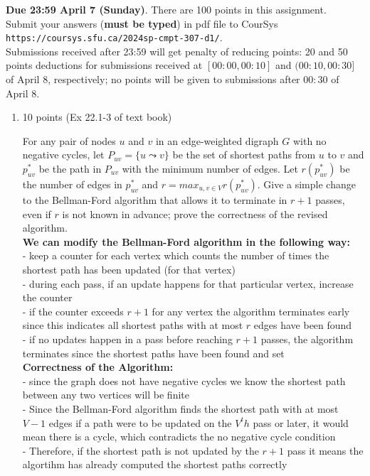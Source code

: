 \documentclass[letterpaper,12pt]{article}
\begin{document}

\pagestyle{myheadings}

\noindent
{\bf Due 23:59 April 7 (Sunday)}. There are 100 points in this assignment. \\
Submit your answers ({\bf must be typed}) in pdf file to CourSys\\
{\tt https://coursys.sfu.ca/2024sp-cmpt-307-d1/}.\\
Submissions received after 23:59 will get penalty of reducing points: 20 and 50 points
deductions for submissions received at $[00:00,00:10]$ and $(00:10,00:30]$ of April 8,
respectively; no points will be given to submissions after $00:30$ of April 8.

\begin{enumerate}
\item 10 points (Ex 22.1-3 of text book)

For any pair of nodes $u$ and $v$ in an edge-weighted digraph $G$ with no negative
cycles, let $P_{uv}=\{u\leadsto v\}$ be the set of shortest paths from $u$ to $v$
and $p^*_{uv}$ be the path in $P_{uv}$ with the minimum number of edges. Let
$r(p^*_{uv})$ be the number of edges in $p^*_{uv}$ and
$r=max_{u,v\in V} r(p^*_{uv})$. Give a simple change to the Bellman-Ford algorithm
that allows it to terminate in $r+1$ passes, even if $r$ is not known in advance;
prove the correctness of the revised algorithm. \\

\textbf{We can modify the Bellman-Ford algorithm in the following way:} \\
- keep a counter for each vertex which counts the number of times the shortest path has been updated (for that vertex) \\
- during each pass, if an update happens for that particular vertex, increase the counter \\
- if the counter exceeds $r+1$ for any vertex the algorithm terminates early since this indicates all shortest paths with at most $r$ edges have been found \\
- if no updates happen in a pass before reaching $r+1$ passes, the algorithm terminates since the shortest paths have been found and set \\

\textbf{Correctness of the Algorithm:} \\
- since the graph does not have negative cycles we know the shortest path between any two vertices will be finite \\
- Since the Bellman-Ford algorithm finds the shortest path with at most $V-1$ edges if a path were to be updated on the $V^th$ pass or later, it would mean there is a cycle, which contradicts the no negative cycle condition \\
- Therefore, if the shortest path is not updated by the $r+1$ pass it means the algortihm has already computed the shortest paths correctly \\


\end{enumerate}
\end{document}
